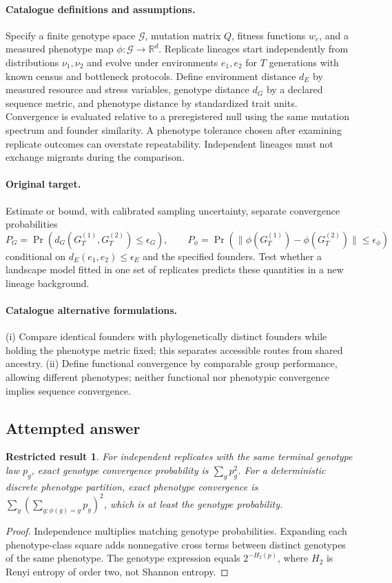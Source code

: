 \documentclass[11pt]{article}
\newcommand{\R}{\mathbb R}
\providecommand{\R}{\mathbb R}
\newtheorem{attemptresult}{Restricted result}[section]
\begin{document}
\paragraph{Catalogue definitions and assumptions.}
Specify a finite genotype space $\mathcal G$, mutation matrix $Q$, fitness functions $w_e$, and a measured phenotype map $\phi:\mathcal G\to\R^d$. Replicate lineages start independently from distributions $\nu_1,\nu_2$ and evolve under environments $e_1,e_2$ for $T$ generations with known census and bottleneck protocols. Define environment distance $d_E$ by measured resource and stress variables, genotype distance $d_G$ by a declared sequence metric, and phenotype distance by standardized trait units. Convergence is evaluated relative to a preregistered null using the same mutation spectrum and founder similarity. A phenotype tolerance chosen after examining replicate outcomes can overstate repeatability. Independent lineages must not exchange migrants during the comparison.
\paragraph{Original target.}
Estimate or bound, with calibrated sampling uncertainty, separate convergence probabilities
\[
 P_G=\Pr(d_G(G_T^{(1)},G_T^{(2)})\le\epsilon_G),\qquad
 P_\phi=\Pr(\|\phi(G_T^{(1)})-\phi(G_T^{(2)})\|\le\epsilon_\phi)
\]
conditional on $d_E(e_1,e_2)\le\epsilon_E$ and the specified founders. Test whether a landscape model fitted in one set of replicates predicts these quantities in a new lineage background.
\paragraph{Catalogue alternative formulations.}
(i) Compare identical founders with phylogenetically distinct founders while holding the phenotype metric fixed; this separates accessible routes from shared ancestry. (ii) Define functional convergence by comparable group performance, allowing different phenotypes; neither functional nor phenotypic convergence implies sequence convergence.
\subsection{Attempted answer}
\begin{attemptresult}
For independent replicates with the same terminal genotype law $p_g$, exact genotype convergence probability is $\sum_gp_g^2$. For a deterministic discrete phenotype partition, exact phenotype convergence is $\sum_y(\sum_{g:\phi(g)=y}p_g)^2$, which is at least the genotype probability.
\end{attemptresult}
\begin{proof}
Independence multiplies matching genotype probabilities. Expanding each phenotype-class square adds nonnegative cross terms between distinct genotypes of the same phenotype. The genotype expression equals $2^{-H_2(p)}$, where $H_2$ is Renyi entropy of order two, not Shannon entropy.
\end{proof}
\end{document}
